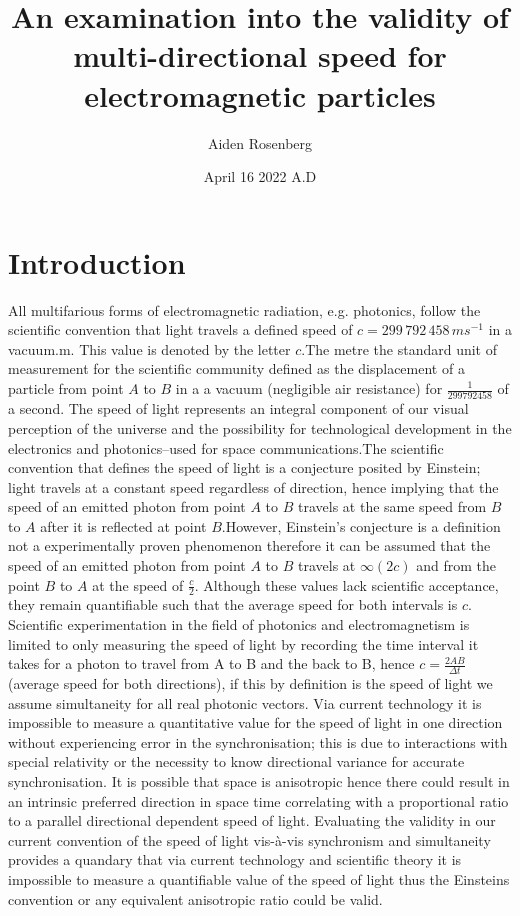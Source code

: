 \documentclass[12pt,letterpaper]{article}
\begin{document}

\title{An examination into the validity of multi-directional speed for electromagnetic particles}
\author{Aiden Rosenberg}
\date{April 16 2022 A.D}
\maketitle
{}
\printnomenclature

\section{Introduction}
All multifarious forms of electromagnetic radiation, e.g. photonics, follow the scientific convention that light travels a defined speed of $c= 299\,792\,458\,ms^{-1}$ in a vacuum.m. This value is denoted by the letter $c$.The metre the standard unit of measurement for the scientific community defined as the displacement of a particle from point $A$ to $B$ in a a vacuum (negligible air resistance) for $\frac{1}{299 792 458}$  of a second. The speed of light represents an integral component of our visual perception of the universe and the possibility for technological development in the electronics and photonics–used for space communications.The scientific convention that defines the speed of light is a conjecture posited by Einstein; light travels at a constant speed regardless of direction, hence implying that the speed of an emitted photon from point $A$ to $B$ travels at the same speed from $B$ to $A$ after it is reflected at point $B$.However, Einstein’s conjecture is a definition not a experimentally proven phenomenon therefore it can be assumed that the speed of an emitted photon from point $A$ to $B$ travels at  $\infty(2c)$ and from the point $B$ to $A$ at the speed of $\frac{c}{2}$. Although these values lack scientific acceptance, they remain quantifiable such that the average speed for both intervals is $c$. Scientific experimentation in the field of photonics and electromagnetism is limited to only measuring the speed of light by recording the time interval it takes for a photon to travel from A to B and the back to B, hence $c=\frac{2AB}{\Delta t}$ (average speed for both directions), if this by definition is the speed of light we assume simultaneity for all real photonic vectors. Via current technology it is impossible to measure a quantitative value for the speed of light in one direction without experiencing error in the synchronisation; this is due to interactions with special relativity or the necessity to know directional variance for accurate synchronisation. It is possible that space is anisotropic hence there could result in an intrinsic preferred direction in space time correlating with a proportional ratio to a parallel directional dependent speed of light. Evaluating the validity in our current convention of the speed of light vis-à-vis synchronism and simultaneity provides a quandary that via current technology and scientific theory it is impossible to measure a quantifiable value of the speed of light thus the Einsteins convention or any equivalent anisotropic ratio could be valid.
\end{document}
